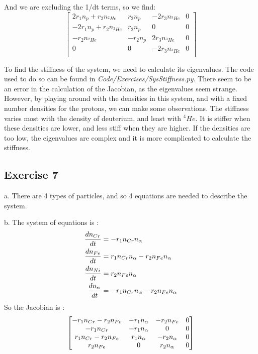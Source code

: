 \documentclass[a4paper,12pt]{article}
\begin{document}
And we are excluding the 1/dt terms, so we find:
\begin{equation}
\begin{bmatrix}
    2r_1n_p + r_2n_{^2He} &  r_2n_p & - 2r_3n_{^3He} &  0\\
    -2r_1n_p + r_2n_{^2He} & r_2n_p & 0 & 0\\
    - r_2n_{^2He} & -r_2n_p & 2r_3n_{^3He} & 0\\
    0 & 0 & -2r_3n_{^3He} & 0\\
\end{bmatrix}
\end{equation}

To find the stiffness of the system, we need to calculate its eigenvalues. The code used to do so can be found in \emph{Code/Exercises/SysStiffness.py}. There seem to be an error in the calculation of the Jacobian, as the eigenvalues seem strange. However, by playing around with the densities in this system, and with a fixed number densities for the protons, we can make some observations. The stiffness varies most with the density of deuterium, and least with $^4He$. It is stiffer when these densities are lower, and less stiff when they are higher. If the densities are too low, the eigenvalues are complex and it is more complicated to calculate the stiffness.

\subsection{Exercise 7}
a. There are 4 types of particles, and so 4 equations are needed to describe the system.
\linebreak

\noindent b. The system of equations is :
\begin{equation*}
\centering
\begin{split}
    \frac{dn_{Cr}}{dt} &= -r_1n_{Cr}n_\alpha\\
    \frac{dn_{Fe}}{dt} &= r_1n_{Cr}n_\alpha-r_2n_{Fe}n_\alpha\\
    \frac{dn_{Ni}}{dt} &= r_2n_{Fe}n_\alpha\\
    \frac{dn_\alpha}{dt} &= -r_1n_{Cr}n_\alpha-r_2n_{Fe}n_\alpha
\end{split}
\end{equation*}
So the Jacobian is :
\begin{equation*}
    \centering
    \begin{bmatrix}
        -r_1n_{Cr} - r_2n_{Fe} & -r_1n_\alpha & -r_2n_{Fe} & 0\\
        -r_1n_{Cr} & -r_1n_\alpha & 0 & 0\\
        r_1n_{Cr} - r_2n_{Fe} & r_1n_\alpha & -r_2n_\alpha & 0\\
        r_2n_{Fe} & 0 & r_2n_\alpha & 0
    \end{bmatrix}
\end{equation*}
\end{document}
